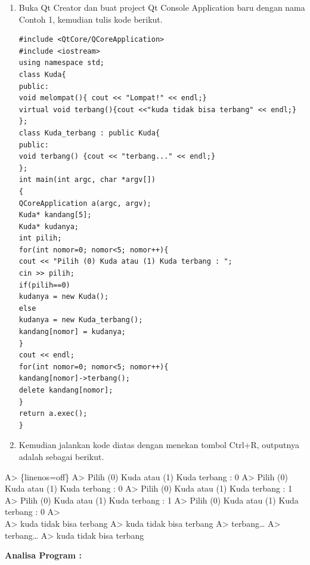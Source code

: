 \begin{enumerate}
\def\labelenumi{\arabic{enumi}.}
\item
  Buka Qt Creator dan buat project Qt Console Application baru dengan
  nama Contoh 1, kemudian tulis kode berikut.

\begin{verbatim}
#include <QtCore/QCoreApplication>
#include <iostream>
using namespace std;
class Kuda{
public:
void melompat(){ cout << "Lompat!" << endl;}
virtual void terbang(){cout <<"kuda tidak bisa terbang" << endl;}
};
class Kuda_terbang : public Kuda{
public:
void terbang() {cout << "terbang..." << endl;}
};
int main(int argc, char *argv[])
{
QCoreApplication a(argc, argv);
Kuda* kandang[5];
Kuda* kudanya;
int pilih;
for(int nomor=0; nomor<5; nomor++){
cout << "Pilih (0) Kuda atau (1) Kuda terbang : ";
cin >> pilih;
if(pilih==0)
kudanya = new Kuda();
else
kudanya = new Kuda_terbang();
kandang[nomor] = kudanya;
}
cout << endl;
for(int nomor=0; nomor<5; nomor++){
kandang[nomor]->terbang();
delete kandang[nomor];
}
return a.exec();
}
\end{verbatim}
\item
  Kemudian jalankan kode diatas dengan menekan tombol Ctrl+R, outputnya
  adalah sebagai berikut.
\end{enumerate}

A\textgreater{} \{linenos=off\} A\textgreater{} Pilih (0) Kuda atau (1)
Kuda terbang : 0 A\textgreater{} Pilih (0) Kuda atau (1) Kuda terbang :
0 A\textgreater{} Pilih (0) Kuda atau (1) Kuda terbang : 1
A\textgreater{} Pilih (0) Kuda atau (1) Kuda terbang : 1 A\textgreater{}
Pilih (0) Kuda atau (1) Kuda terbang : 0 A\textgreater{}\\
A\textgreater{} kuda tidak bisa terbang A\textgreater{} kuda tidak bisa
terbang A\textgreater{} terbang\ldots{} A\textgreater{} terbang\ldots{}
A\textgreater{} kuda tidak bisa terbang

\textbf{Analisa Program :}

